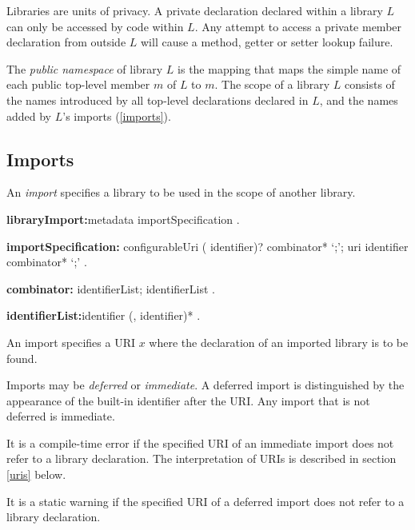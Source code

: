\documentclass{article}
\begin{document}
\LMHash{}
Libraries are units of privacy.
A private declaration declared within a library $L$ can only be accessed by code within $L$.
Any attempt to access a private member declaration from outside $L$ will cause a method, getter or setter lookup failure.


\LMHash{}
The {\em public namespace} of library $L$ is the mapping that maps the simple name of each public top-level member $m$ of $L$ to $m$.
The scope of a library $L$ consists of the names introduced by all top-level declarations declared in $L$, and the names added by $L$'s imports (\ref{imports}).


\subsection{Imports}

\LMHash{}
An {\em import} specifies a library to be used in the scope of another library.
\begin{grammar}
{\bf libraryImport:}metadata importSpecification
  .

{\bf importSpecification:}\IMPORT{} configurableUri (\AS{} identifier)? combinator* `{\escapegrammar ;}';
  \IMPORT{} uri \DEFERRED{} \AS{} identifier combinator* `{\escapegrammar ;}'
  .

{\bf combinator:}\SHOW{} identifierList;
  \HIDE{} identifierList
  .

{\bf identifierList:}identifier (, identifier)*
  .
\end{grammar}

\LMHash{}
An import specifies a URI $x$ where the declaration of an imported library is to be found.

\LMHash{}
Imports may be {\em deferred} or {\em immediate}.
A deferred import is distinguished by the appearance of the built-in identifier \DEFERRED{} after the URI.
Any import that is not deferred is immediate.

\LMHash{}
It is a compile-time error if the specified URI of an immediate import does not refer to a library declaration.
The interpretation of URIs is described in section \ref{uris} below.

\LMHash{}
It is a static warning if the specified URI of a deferred import does not refer to a library declaration.

\end{document}
